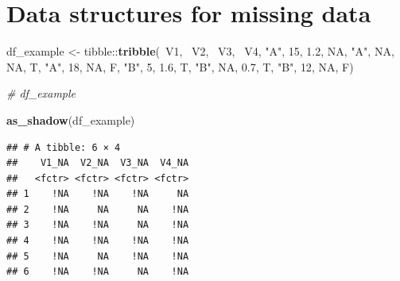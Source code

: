 \documentclass[]{article}
\newenvironment{Shaded}{\begin{snugshade}}{\end{snugshade}}
\newcommand{\KeywordTok}[1]{\textcolor[rgb]{0.13,0.29,0.53}{\textbf{{#1}}}}
\newcommand{\DataTypeTok}[1]{\textcolor[rgb]{0.13,0.29,0.53}{{#1}}}
\newcommand{\DecValTok}[1]{\textcolor[rgb]{0.00,0.00,0.81}{{#1}}}
\newcommand{\FloatTok}[1]{\textcolor[rgb]{0.00,0.00,0.81}{{#1}}}
\newcommand{\StringTok}[1]{\textcolor[rgb]{0.31,0.60,0.02}{{#1}}}
\newcommand{\CommentTok}[1]{\textcolor[rgb]{0.56,0.35,0.01}{\textit{{#1}}}}
\newcommand{\OtherTok}[1]{\textcolor[rgb]{0.56,0.35,0.01}{{#1}}}
\newcommand{\NormalTok}[1]{{#1}}
\begin{document}
\section{Data structures for missing
data}\label{data-structures-for-missing-data}

\begin{Shaded}
\begin{Highlighting}[]
\NormalTok{df_example <-}\StringTok{  }\NormalTok{tibble::}\KeywordTok{tribble}\NormalTok{(~V1, ~V2, ~V3, ~V4,}
                               \StringTok{"A"}\NormalTok{, }\DecValTok{15}\NormalTok{, }\FloatTok{1.2}\NormalTok{, }\OtherTok{NA}\NormalTok{,}
                               \StringTok{"A"}\NormalTok{, }\OtherTok{NA}\NormalTok{, }\OtherTok{NA}\NormalTok{, T,}
                               \StringTok{"A"}\NormalTok{, }\DecValTok{18}\NormalTok{, }\OtherTok{NA}\NormalTok{, F,}
                               \StringTok{"B"}\NormalTok{, }\DecValTok{5}\NormalTok{, }\FloatTok{1.6}\NormalTok{, T,}
                               \StringTok{"B"}\NormalTok{, }\OtherTok{NA}\NormalTok{, }\FloatTok{0.7}\NormalTok{, T,}
                               \StringTok{"B"}\NormalTok{, }\DecValTok{12}\NormalTok{, }\OtherTok{NA}\NormalTok{, F)}

\CommentTok{# df_example}

\KeywordTok{as_shadow}\NormalTok{(df_example)}
\end{Highlighting}
\end{Shaded}

\begin{verbatim}
## # A tibble: 6 × 4
##    V1_NA  V2_NA  V3_NA  V4_NA
##   <fctr> <fctr> <fctr> <fctr>
## 1    !NA    !NA    !NA     NA
## 2    !NA     NA     NA    !NA
## 3    !NA    !NA     NA    !NA
## 4    !NA    !NA    !NA    !NA
## 5    !NA     NA    !NA    !NA
## 6    !NA    !NA     NA    !NA
\end{verbatim}

\begin{Shaded}
\end{Shaded}
\end{document}
